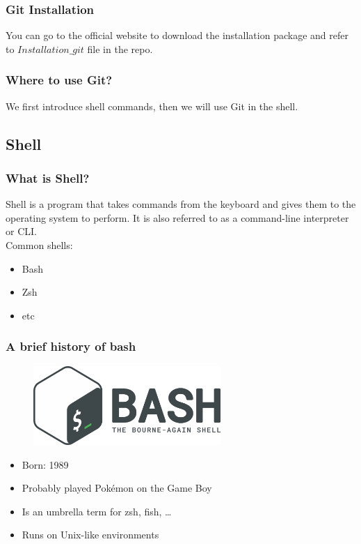 \documentclass[aspectratio=169]{beamer}
\begin{document}
\begin{frame}
  \frametitle{Git Installation}
  You can go to the official website to download the installation package and refer to $Installation\_git$ file in the repo.
\end{frame}

\begin{frame}
  \frametitle{Where to use Git?}
  We first introduce shell commands, then we will use Git in the shell.
\end{frame}

\subsection{Shell}
\begin{frame}
  \frametitle{What is Shell?}
  Shell is a program that takes commands from the keyboard and gives them to the operating system to perform. It is also referred to as a command-line interpreter or CLI.
  \\
  Common shells:
  \begin{itemize}
    \item Bash
    \item Zsh
    \item etc
  \end{itemize}
\end{frame}

\begin{frame}
  \frametitle{A brief history of bash}
  \begin{figure}[h]
    \centering
    \includegraphics[height=3cm]{./assets/bash_logo.png}
  \end{figure}
  \begin{itemize}
    \item Born: 1989
    \item Probably played Pokémon on the Game Boy
    \item Is an umbrella term for zsh, fish, …
    \item Runs on Unix-like environments
  \end{itemize}
\end{frame}
\end{document}
